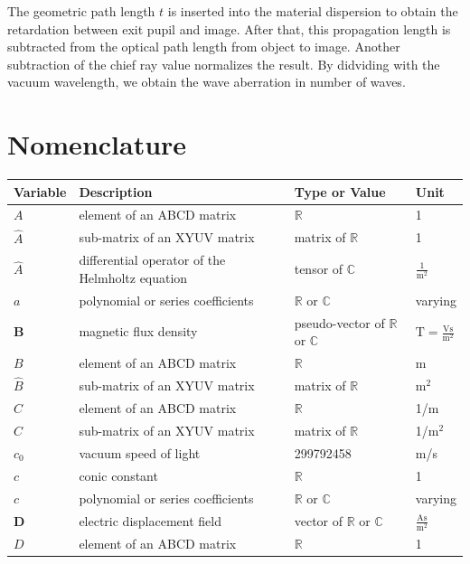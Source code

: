 \documentclass[12pt,a4paper,twoside,openright,BCOR10mm,headsepline,titlepage,abstracton,chapterprefix,final]{scrreprt}
\newcommand\Vector[1]{{\mathbf{#1}}}
\newcommand\vacuum{0}
\newcommand\scalarBfield{B}
\newcommand\scalarDfield{D}
\newcommand\Bfield{\Vector{\scalarBfield}}
\newcommand\Dfield{\Vector{\scalarDfield}}
\newcommand\meter{\textrm{m}}
\newcommand\second{\textrm{s}}
\newcommand\ampere{\textrm{A}}
\newcommand\volt{\textrm{V}}
\newcommand\tesla{\textrm{T}}
\begin{document}
The geometric path length $t$ is inserted into the material dispersion to obtain the retardation between exit pupil and image. After that, this propagation length is subtracted from the optical path length from object to image.
Another subtraction of the chief ray value normalizes the result.
By didviding with the vacuum wavelength, we obtain the wave aberration in number of waves.







\chapter{Nomenclature}
\begin{tabular}{l|l|l|l}
 Variable & Description & Type or Value & Unit \\
 \hline
 $A$ & element of an ABCD matrix & $\mathbb{R}$ & 1 \\
 $\hat{A}$ & sub-matrix of an XYUV matrix & matrix of $\mathbb{R}$ & 1 \\
 $\hat{A}$ & differential operator of the Helmholtz equation & tensor of $\mathbb{C}$ & $\frac{1}{\meter^2}$\\
 $a$ & polynomial or series coefficients & $\mathbb{R}$ or $\mathbb{C}$ & varying\\
 \hline
 $\Bfield$ & magnetic flux density & pseudo-vector of $\mathbb{R}$ or $\mathbb{C}$ & $\tesla = \frac{\volt\second}{\meter^2} $\\
 $B$ & element of an ABCD matrix & $\mathbb{R}$ & \meter \\
 $\hat{B}$ & sub-matrix of an XYUV matrix & matrix of $\mathbb{R}$ & $\meter^2$ \\
 \hline
 $C$ & element of an ABCD matrix & $\mathbb{R}$ & 1/\meter\\
 $\hat{C}$ & sub-matrix of an XYUV matrix & matrix of $\mathbb{R}$ & 1/$\meter^2$\\
 $c_\vacuum$ & vacuum speed of light & 299792458 & \meter /\second \\
 $c$ & conic constant & $\mathbb{R}$ & 1 \\
 $c$ & polynomial or series coefficients & $\mathbb{R}$ or $\mathbb{C}$ & varying\\
 \hline
 $\Dfield$ & electric displacement field & vector of $\mathbb{R}$ or $\mathbb{C}$ & $\frac{\ampere \second}{\meter^2}$\\
 $D$ & element of an ABCD matrix & $\mathbb{R}$ & 1\\

\end{tabular}
\end{document}
